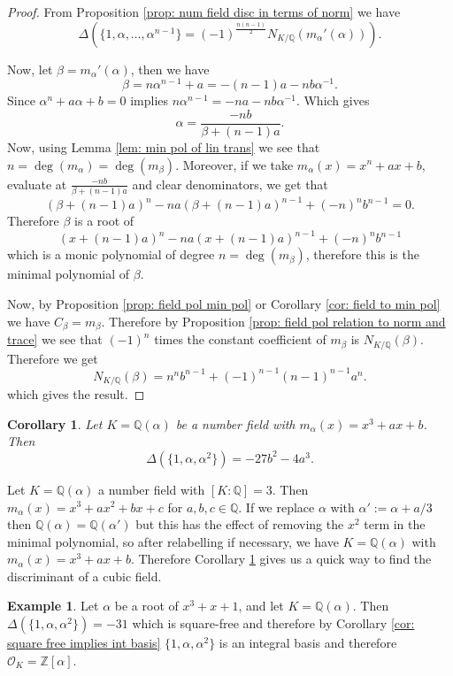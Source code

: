 \documentclass[11pt,a4paper]{report}
\theoremstyle{plain}
\newtheorem{corollary}[subsection]{Corollary}
\theoremstyle{definition}
\newtheorem{exmp}[subsection]{Example}
\theoremstyle{definition}
\newcommand{\ZZ}{\mathbb{Z}}
\def\QQ{\mathbb{Q}}
\def \a{\alpha}
\def \OO {\mathcal{O}}
\begin{document}
	
	\begin{proof}
		From Proposition \ref{prop: num field disc in terms of norm} we have \[\Delta(\{1,\a,\dots,\a^{n-1}\}=(-1)^{\frac{n(n-1)}{2}}N_{K/\QQ}(m_\a'(\a))).\]
		
		Now, let $\beta=m_\a'(\a)$, then we have \[\beta=n \a^{n-1}+a=-(n-1)a-nb\a^{-1}.\]      Since $\a^n+a\a+b=0$ implies $n\a^{n-1}=-na-nb\a^{-1}$. Which gives \[\a =\frac{-nb}{\beta+(n-1)a}.\] Now, using Lemma \ref{lem: min pol of lin trans} we see that $n=\deg(m_\a)=\deg(m_\beta)$. Moreover, if we take $m_\a(x)=x^n+ax+b$, evaluate at $\frac{-nb}{\beta+(n-1)a}$ and clear denominators, we get that \[(\beta+(n-1)a)^n-na(\beta+(n-1)a)^{n-1}+(-n)^nb^{n-1}=0.\] Therefore $\beta$ is a root of \[(x+(n-1)a)^n-na(x+(n-1)a)^{n-1}+(-n)^nb^{n-1}\] which is a monic polynomial of degree $n=\deg(m_\beta)$, therefore this is the minimal polynomial of $\beta$.
		
		Now, by Proposition \ref{prop: field pol min pol} or Corollary \ref{cor: field to min pol} we have $C_\beta=m_\beta$. Therefore by Proposition \ref{prop: field pol relation to norm and trace} we see that $(-1)^n$ times the constant coefficient of $m_\beta$ is $N_{K/\QQ}(\beta)$. Therefore we get \[N_{K/\QQ}(\beta)=n^nb^{n-1}+(-1)^{n-1}(n-1)^{n-1}a^n.\] which gives the result.
		
		
		
	\end{proof} 
	
	\begin{corollary}\label{cor: disc of cubic field}
		Let $K=\QQ(\a)$ be a number field with $m_\a(x)=x^3+ax+b$. Then \[\Delta(\{1,\a,\a^2\})=-27b^2-4a^3.\]
	\end{corollary}
	
	Let $K=\QQ(\a)$ a number field with $[K:\QQ]=3$. Then $m_\a(x)=x^3+ax^2+bx+c$ for $a,b,c \in \QQ$. If we replace $\a$ with $\a':=\a+a/3$ then $\QQ(\a)=\QQ(\a')$ but this has the effect of removing the $x^2$ term in the minimal polynomial, so after relabelling if necessary, we have $K=\QQ(\a)$ with $m_{\a}(x)=x^3+ax+b$. Therefore Corollary \ref{cor: disc of cubic field} gives us a quick way to find the discriminant of a cubic field.
	
	\begin{exmp}
		Let $\a$ be a root of $x^3+x+1$, and let $K=\QQ(\a)$. Then $\Delta(\{1,\a,\a^2\})=-31$ which is square-free and therefore by Corollary \ref{cor: square free implies int basis} $\{1,\a,\a^2\}$ is an integral basis and therefore $\OO_K=\ZZ[\a]$.
	\end{exmp}
	
\end{document}
